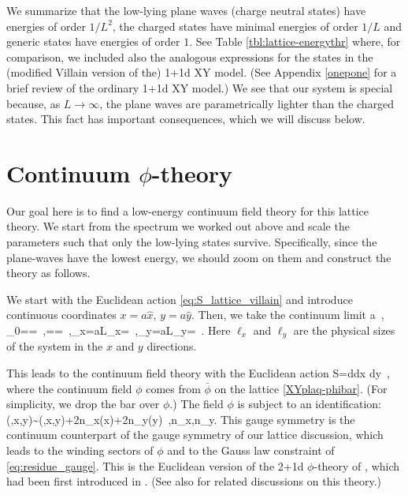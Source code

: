 \documentclass[12pt]{article}
\numberwithin{equation}{section}
\begin{document}
We summarize that the low-lying plane waves (charge neutral states) have energies of order $1/L^2$, the charged states have minimal energies of order $1/L$ and generic states have energies of order $1$.  See  Table \ref{tbl:lattice-energythr} where, for comparison, we included also the analogous expressions for the states in the (modified Villain version of the) 1+1d XY model.
(See Appendix \ref{onepone} for a brief review of the ordinary 1+1d XY model.)
 We see that our system is special because, as $L\to \infty$, the plane waves are parametrically lighter than the charged states.  This fact has important consequences, which we will discuss below.











\section{Continuum $\phi$-theory}\label{sec:cont}


Our goal here is to find a low-energy continuum field theory for this lattice theory.  We start from the spectrum we worked out above and scale the parameters such that only the low-lying states survive.  Specifically, since the plane-waves have the lowest energy, we should zoom on them and construct the theory as follows.

We start with the Euclidean action \eqref{eq:S_lattice_villain} and introduce continuous coordinates $x=a\hat x$, $y=a\hat y$.  Then, we take the continuum limit
\ie\label{eq:continuum_limit}
a~, \quad \mu_0==~,\quad \mu==~,\quad \ell_x=aL_x=~,\quad \ell_y=aL_y=~.
\fe
Here $\ell_x$ and $\ell_y$ are the physical sizes of the system in the $x$ and $y$ directions.

This leads to the continuum field theory with the Euclidean action
\ie\label{eq:action_continuum}
S=\int d\tau dx dy~,
\fe
where the continuum field $\phi$ comes from $\bar\phi$ on the lattice \eqref{XYplaq-phibar}. (For simplicity, we drop the bar over $\phi$.) The field $\phi$ is subject to an identification:
\ie\label{nxyid}
\phi(\tau,x,y)\sim\phi(\tau,x,y)+2\pi n_x(x)+2\pi n_y(y)~,\qquad n_x,n_y\in{}.
\fe
This gauge symmetry is the continuum counterpart of the gauge symmetry of our lattice discussion, which leads to the winding sectors of $\phi$ and to the Gauss law constraint of \eqref{eq:residue_gauge}.
This is the Euclidean version of the 2+1d $\phi$-theory of \cite{paper1}, which had been first introduced in \cite{PhysRevB.66.054526}.
(See also \cite{Tay_2011,You:2019cvs,You:2019bvu,Karch:2020yuy,You:2021tmm}  for related discussions on this theory.)
\end{document}
